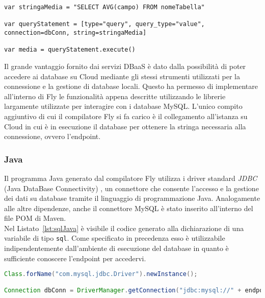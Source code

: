 \begin{lstlisting}[language=FLY,caption={Dichiarazione di entità query per l'esecuzione di un'interrogazione di aggregazione di media che utilizza una variabile di tipo stringa.}, label={lst:queryValue}]
var stringaMedia = "SELECT AVG(campo) FROM nomeTabella"

var queryStatement = [type="query", query_type="value", connection=dbConn, string=stringaMedia]

var media = queryStatement.execute()
\end{lstlisting}

Il grande vantaggio fornito dai servizi DBaaS è dato dalla possibilità di poter accedere ai database su Cloud mediante gli stessi strumenti utilizzati per la connessione e la gestione di database locali. Questo ha permesso di implementare all'interno di Fly le funzionalità appena descritte utilizzando le librerie largamente utilizzate per interagire con i database MySQL. L'unico compito aggiuntivo di cui il compilatore Fly si fa carico è il collegamento all'istanza su Cloud in cui è in esecuzione il database per ottenere la stringa necessaria alla connessione, ovvero l'endpoint.

\subsubsection{Java}
Il programma Java generato dal compilatore Fly utilizza i driver standard \textit{JDBC} (Java DataBase Connectivity) \cite{jdbc}, un connettore che consente l'accesso e la gestione dei dati su database tramite il linguaggio di programmazione Java. Analogamente alle altre dipendenze, anche il connettore MySQL è stato inserito all'interno del file POM di Maven.\\
Nel Listato~\ref{lst:sqlJava} è visibile il codice generato alla dichiarazione di una variabile di tipo \verb|sql|. Come specificato in precedenza esso è utilizzabile indipendentemente dall'ambiente di esecuzione del database in quanto è sufficiente conoscere l'endpoint per accedervi.\\

\begin{lstlisting}[language=Java,caption={Codice Java generato per la variabile di tipo sql.}, label={lst:sqlJava}]
Class.forName("com.mysql.jdbc.Driver").newInstance();

Connection dbConn = DriverManager.getConnection("jdbc:mysql://" + endpoint + "/nomeDatabase?user=user&password=password");
\end{lstlisting}  

